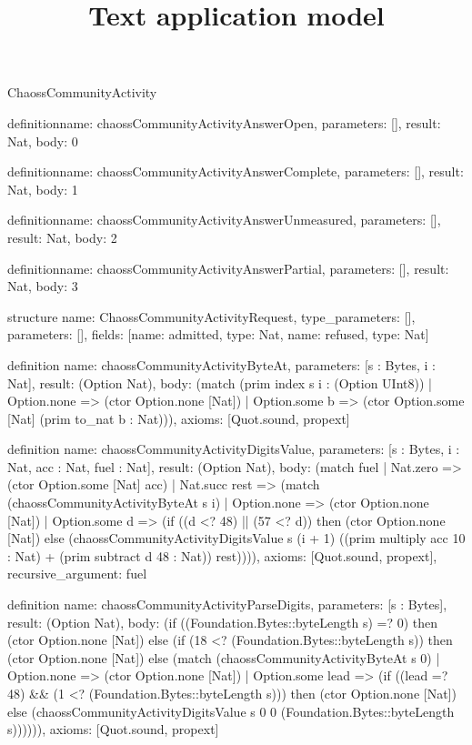 \begin{lexlean}{ChaossCommunityActivity}
\title{Text application model}
\begin{semanticmodule}
definition{name: chaossCommunityActivityAnswerOpen, parameters: [], result: Nat, body: 0}

definition{name: chaossCommunityActivityAnswerComplete, parameters: [], result: Nat, body: 1}

definition{name: chaossCommunityActivityAnswerUnmeasured, parameters: [], result: Nat, body: 2}

definition{name: chaossCommunityActivityAnswerPartial, parameters: [], result: Nat, body: 3}

structure{
  name: ChaossCommunityActivityRequest,
  type_parameters: [],
  parameters: [],
  fields: [{name: admitted, type: Nat}, {name: refused, type: Nat}]
}

definition{
  name: chaossCommunityActivityByteAt,
  parameters: [s : Bytes, i : Nat],
  result: (Option Nat),
  body: (match (prim index s i : (Option UInt8))
    | Option.none => (ctor Option.none [Nat])
    | Option.some b => (ctor Option.some [Nat] (prim to_nat b : Nat))),
  axioms: [Quot.sound, propext]
}

definition{
  name: chaossCommunityActivityDigitsValue,
  parameters: [s : Bytes, i : Nat, acc : Nat, fuel : Nat],
  result: (Option Nat),
  body: (match fuel
    | Nat.zero => (ctor Option.some [Nat] acc)
    | Nat.succ rest => (match (chaossCommunityActivityByteAt s i)
      | Option.none => (ctor Option.none [Nat])
      | Option.some d => (if ((d <? 48) || (57 <? d)) then (ctor Option.none [Nat]) else (chaossCommunityActivityDigitsValue s (i + 1) ((prim multiply acc 10 : Nat) + (prim subtract d 48 : Nat)) rest)))),
  axioms: [Quot.sound, propext],
  recursive_argument: fuel
}

definition{
  name: chaossCommunityActivityParseDigits,
  parameters: [s : Bytes],
  result: (Option Nat),
  body: (if ((Foundation.Bytes::byteLength s) =? 0) then (ctor Option.none [Nat]) else (if (18 <? (Foundation.Bytes::byteLength s)) then (ctor Option.none [Nat]) else (match (chaossCommunityActivityByteAt s 0)
    | Option.none => (ctor Option.none [Nat])
    | Option.some lead => (if ((lead =? 48) && (1 <? (Foundation.Bytes::byteLength s))) then (ctor Option.none [Nat]) else (chaossCommunityActivityDigitsValue s 0 0 (Foundation.Bytes::byteLength s)))))),
  axioms: [Quot.sound, propext]
}


\end{semanticmodule}
\end{lexlean}
